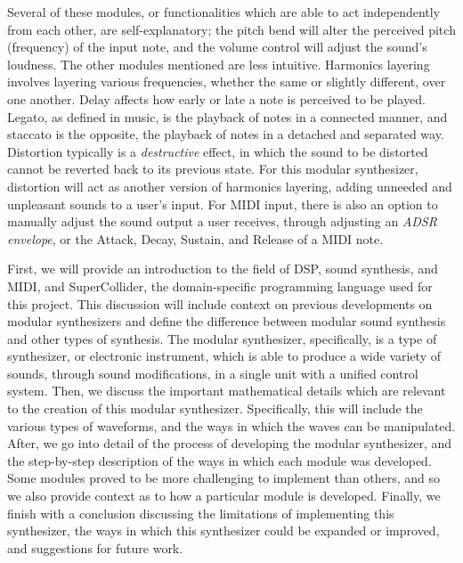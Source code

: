 Several of these modules, or functionalities which are able to act independently from each other, are self-explanatory; the pitch bend will alter the perceived pitch (frequency) of the input note, and the volume control will adjust the sound's loudness. The other modules mentioned are less intuitive. Harmonics layering involves layering various frequencies, whether the same or slightly different, over one another. Delay affects how early or late a note is perceived to be played. Legato, as defined in music, is the playback of notes in a connected manner, and staccato is the opposite, the playback of notes in a detached and separated way. Distortion typically is a \textit{destructive} effect, in which the sound to be distorted cannot be reverted back to its previous state. For this modular synthesizer, distortion will act as another version of harmonics layering, adding unneeded and unpleasant sounds to a user's input. For MIDI input, there is also an option to manually adjust the sound output a user receives, through adjusting an \textit{ADSR envelope}, or the Attack, Decay, Sustain, and Release of a MIDI note.

First, we will provide an introduction to the field of DSP, sound synthesis, and MIDI, and SuperCollider, the domain-specific programming language used for this project. This discussion will include context on previous developments on modular synthesizers and define the difference between modular sound synthesis and other types of synthesis. The modular synthesizer, specifically, is a type of synthesizer, or electronic instrument, which is able to produce a wide variety of sounds, through sound modifications, in a single unit with a unified control system. Then, we discuss the important mathematical details which are relevant to the creation of this modular synthesizer. Specifically, this will include the various types of waveforms, and the ways in which the waves can be manipulated. After, we go into detail of the process of developing the modular synthesizer, and the step-by-step description of the ways in which each module was developed. Some modules proved to be more challenging to implement than others, and so we also provide context as to how a particular module is developed. Finally, we finish with a conclusion discussing the limitations of implementing this synthesizer, the ways in which this synthesizer could be expanded or improved, and suggestions for future work.